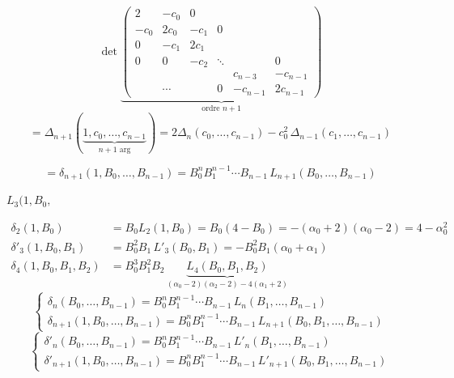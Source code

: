 \documentclass[11pt,a4paper]{article}
\begin{document}
\[
\det \underbrace{\begin{pmatrix}
2 & -c_0 & 0 & & & \\
-c_0 & 2c_0 & -c_1 & 0 & & \\
0 & -c_1 & 2c_1 & & & \\
0 & 0 & -c_2 & \ddots & & 0 \\
 & & & & c_{n-3} & -c_{n-1} \\
 & \cdots & & 0 & -c_{n-1} & 2c_{n-1}
\end{pmatrix}}_{\text{ordre } n+1}
\]
\[
= \Delta_{n+1}(\underbrace{1, c_0, \ldots, c_{n-1}}_{n+1 \text{ arg}})
= 2\Delta_n(c_0, \ldots, c_{n-1}) - c_0^2\, \Delta_{n-1}(c_1, \ldots, c_{n-1})
\]

\[
= \delta_{n+1}(1, B_0, \ldots, B_{n-1}) = B_0^n B_1^{n-1} \cdots B_{n-1}\,
L_{n+1}(B_0, \ldots, B_{n-1})
\]

 \quad $L_3(1, B_0,$

\[
\begin{aligned}
\delta_2(1, B_0)  &= B_0 L_2(1, B_0) = B_0(4 - B_0)
= -(\alpha_0 + 2)(\alpha_0 - 2) = 4 - \alpha_0^2 \\
\delta'_3(1, B_0, B_1) &= B_0^2 B_1\, L'_3(B_0, B_1) = 
- B_0^2 B_1 (\alpha_0 + \alpha_1) \\
\delta_4(1, B_0, B_1, B_2) &= B_0^3 B_1^2 B_2\,
\underbrace{L_4(B_0, B_1, B_2)}_{(\alpha_0 - 2)(\alpha_2 - 2) - 4(\alpha_1 + 2)}
\end{aligned}
\]
\[
\begin{cases}
\delta_n(B_0, \ldots, B_{n-1}) = B_0^n B_1^{n-1} \cdots B_{n-1}\, L_n(B_1, \ldots, B_{n-1}) \\
\delta_{n+1}(1, B_0, \ldots, B_{n-1}) = B_0^n B_1^{n-1} \cdots B_{n-1}\, L_{n+1}(B_0, B_1, \ldots, B_{n-1})
\end{cases}
\]
\[
\begin{cases}
\delta'_n(B_0, \ldots, B_{n-1}) = B_0^n B_1^{n-1} \cdots B_{n-1}\, L'_n(B_1, \ldots, B_{n-1}) \\
\delta'_{n+1}(1, B_0, \ldots, B_{n-1}) = B_0^n B_1^{n-1} \cdots B_{n-1}\, L'_{n+1}(B_0, B_1, \ldots, B_{n-1})
\end{cases}
\]
\end{document}

